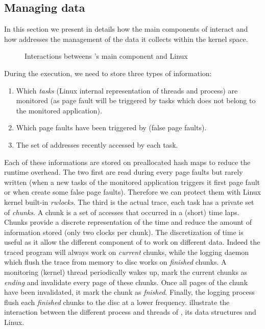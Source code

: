 \subsection{Managing data}
\label{sec:design-tech}

In this section we present in details how the main components of \Moca
interact and how \Moca addresses the management of the data it collects
within the kernel space.

\begin{figure}[htb]
    \centering
    \caption{Interactions betweens \Moca's main component and Linux}
    \label{fig:moca}
\end{figure}


During the execution, we need to store three types of information:
\begin{enumerate}
    \item Which \emph{tasks} (Linux internal representation of threads and process) are
monitored (as page fault will be triggered by tasks which does not belong to
the monitored application).
    \item Which page faults have been triggered by \Moca (false page faults).
    \item The set of addresses recently accessed by each task.
\end{enumerate}

Each of these informations are stored on preallocated hash maps to reduce the
runtime overhead.  The two first are read during every page faults but rarely
written (when a new tasks of the monitored application triggers it first page
fault or when \Moca create some false page faults). Therefore we can protect
them with Linux kernel built-in \emph{rwlocks}. The third is the actual
trace, each task has a private set of \emph{chunks}. A chunk is a set of
accesses that occurred in a (short) time laps.  Chunks provide a discrete
representation of the time and reduce the amount of information stored (only
two clocks per chunk). The discretization of time is useful as it allow the
different component of \Moca to work on different data.  Indeed the traced
program will always work on \emph{current} chunks, while the logging daemon
which flush the trace from memory to disc works on \emph{finished} chunks. A
monitoring (kernel) thread periodically wakes up, mark the current chunks as
\emph{ending} and invalidate every page of these chunks. Once all pages of the
chunk have been invalidated, it mark the chunk as \emph{fnished}. Finally, the
logging process flush each \emph{finished} chunks to the disc at a lower
frequency.   illustrate the interaction between the
different process and threads of \Moca, its data structures and Linux.

